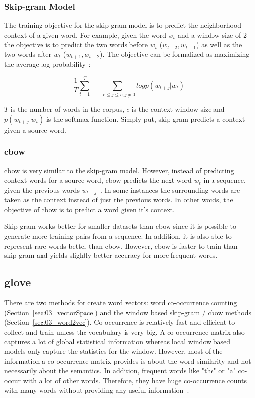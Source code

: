 \subsubsection*{Skip-gram Model}

The training objective for the skip-gram model is to predict the neighborhood context of a given word. For example, given the word $w_t$ and a window size of 2 the objective is to predict the two words before $w_t$ {($w_{t-2}, w_{t-1}$)} as well as the two words after $w_t$ {($w_{t+1}, w_{t+2}$)}. The objective can be formalized as maximizing the average log probability~\cite{Mikolov2013e}:

\begin{equation}
\frac{1}{T} \sum_{t=1}^T \quad \sum_{-c\leq j \leq c, j \neq 0} log p(w_{t+j} | w_t)
\end{equation}

$T$ is the number of words in the corpus, $c$ is the context window size and $p(w_{t+j} | w_t)$ is the softmax function. Simply put, skip-gram predicts a context given a source word.

\subsubsection*{\acrfull{cbow}}

\gls{cbow} is very similar to the skip-gram model. However, instead of predicting context words for a source word, \gls{cbow} predicts the next word $w_{t}$ in a sequence, given the previous words $w_{t-j}$~\cite{Mikolov2013c}. In some instances the surrounding words are taken as the context instead of just the previous words. In other words, the objective of \gls{cbow} is to predict a word given it's context.
\medskip

Skip-gram works better for smaller datasets than \gls{cbow} since it is possible to generate more training pairs from a sequence. In addition, it is also able to represent rare words better than \gls{cbow}. However, \gls{cbow} is faster to train than skip-gram and yields slightly better accuracy for more frequent words.

\subsection{\acrfull{glove}}

There are two methods for create word vectors: word co-occurrence counting {(Section~\ref{sec:03_vectorSpace})} and the window based skip-gram / \gls{cbow} methods {(Section~\ref{sec:03_word2vec})}. Co-occurrence is relatively fast and efficient to collect and train unless the vocabulary is very big. A co-occurrence matrix also captures a lot of global statistical information whereas local window based models only capture the statistics for the window. However, most of the information a co-occurrence matrix provides is about the word similarity and not necessarily about the semantics. In addition, frequent words like "the" or "a" co-occur with a lot of other words. Therefore, they have huge co-occurrence counts with many words without providing any useful information~\cite{Pennington2014a}.

